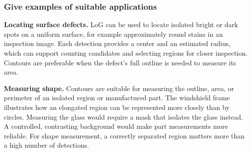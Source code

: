 \subsubsection{Give examples of suitable applications}
\textbf{Locating surface defects.} LoG can be used to locate isolated bright or
dark spots on a uniform surface, for example approximately round stains in an
inspection image. Each detection provides a center and an estimated radius,
which can support counting candidates and selecting regions for closer
inspection. Contours are preferable when the defect's full outline is needed
to measure its area.

\textbf{Measuring shape.} Contours are suitable for measuring the outline,
area, or perimeter of an isolated region or manufactured part. The windshield
frame illustrates how an elongated region can be represented more closely than
by circles. Measuring the glass would require a mask that isolates the glass
instead. A controlled, contrasting background would make part measurements
more reliable. For shape measurement, a correctly separated region matters more
than a high number of detections.
\FloatBarrier
